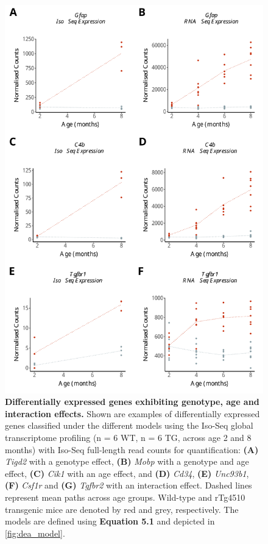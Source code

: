 \begin{figure}[h]
	\centering
	\includegraphics[page=5,scale = 0.55]{Figures/WholeDifferentialAnalysis.pdf}
	\captionsetup{width=0.95\textwidth}
	\caption[Examples of differential expression associated with genotype, age \& interaction effects]%
	{\textbf{Differentially expressed genes exhibiting genotype, age and interaction effects.} Shown are examples of differentially expressed genes classified under the different models using the Iso-Seq global transcriptome profiling (n = 6 WT, n = 6 TG, across age 2 and 8 months) with Iso-Seq full-length read counts for quantification: \textbf{(A)} \textit{Tigd2} with a genotype effect, \textbf{(B)} \textit{Mobp} with a genotype and age effect, \textbf{(C)} \textit{Cik1} with an age effect, and \textbf{(D)} \textit{Cd34}, \textbf{(E)} \textit{Unc93b1}, \textbf{(F)} \textit{Csf1r} and \textbf{(G)} \textit{Tgfbr2} with an interaction effect. Dashed lines represent mean paths across age groups. Wild-type and rTg4510 transgenic mice are denoted by red and grey, respectively. The models are defined using \textbf{Equation 5.1} and depicted in \cref{fig:dea_model}.}   
	\label{fig:dea_model_genexp}
\end{figure}
 

